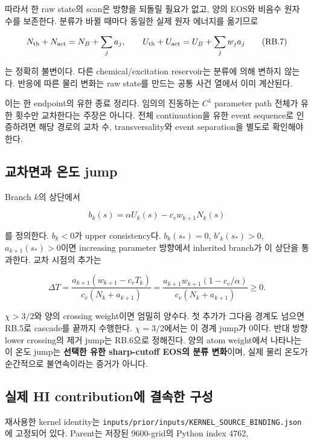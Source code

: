 따라서 한 raw state의 scan은 방향을 되돌릴 필요가 없고, 양의 EOS와 비음수 원자 수를 보존한다. 분류가 바뀔 때마다 동일한 실제 원자 에너지를 옮기므로

\[N_{\rm th}+N_{\rm act}=N_B+\sum_j a_j,\qquad U_{\rm th}+U_{\rm act}=U_B+\sum_jw_ja_j\tag{RB.7}\]

는 정확히 불변이다. 다른 chemical/excitation reservoir는 분류에 의해 변하지 않는다. 반응에 따른 물리 변화는 raw state를 만드는 공통 사건 열에서 이미 계산된다.

이는 한 endpoint의 유한 종료 정리다. 임의의 진동하는 \(C^1\) parameter path 전체가 유한 횟수만 교차한다는 주장은 아니다. 전체 continuation을 유한 event sequence로 인증하려면 해당 경로의 교차 수, transversality와 event separation을 별도로 확인해야 한다.

\hypertarget{uxad50uxcc28uxba74uxacfc-uxc628uxb3c4-jump}{%
\subsection{교차면과 온도 jump}\label{uxad50uxcc28uxba74uxacfc-uxc628uxb3c4-jump}}

Branch \(k\)의 상단에서

\[b_k(s)=\alpha U_k(s)-c_vw_{k+1}N_k(s)\tag{RB.8}\]

를 정의한다. \(b_k<0\)가 upper consistency다. \(b_k(s_*)=0\), \(b'_k(s_*)>0\), \(a_{k+1}(s_*)>0\)이면 increasing parameter 방향에서 inherited branch가 이 상단을 통과한다. 교차 시점의 추가는

\[\Delta T=\frac{a_{k+1}(w_{k+1}-c_vT_k)}{c_v(N_k+a_{k+1})}
=\frac{a_{k+1}w_{k+1}(1-c_v/\alpha)}{c_v(N_k+a_{k+1})}\ge0.\tag{RB.9}\]

\(\chi>3/2\)와 양의 crossing weight이면 엄밀히 양수다. 첫 추가가 그다음 경계도 넘으면 RB.5로 cascade를 끝까지 수행한다. \(\chi=3/2\)에서는 이 경계 jump가 0이다. 반대 방향 lower crossing의 제거 jump는 RB.6으로 정해진다. 양의 atom weight에서 나타나는 이 온도 jump는 \textbf{선택한 유한 sharp-cutoff EOS의 분류 변화}이며, 실제 물리 온도가 순간적으로 불연속이라는 증거가 아니다.

\hypertarget{uxc2e4uxc81c-hi-contributionuxc5d0-uxacb0uxc18duxd55c-uxad6cuxc131}{%
\subsection{실제 HI contribution에 결속한 구성}\label{uxc2e4uxc81c-hi-contributionuxc5d0-uxacb0uxc18duxd55c-uxad6cuxc131}}

재사용한 kernel identity는 \nolinkurl{inputs/prior/inputs/KERNEL_SOURCE_BINDING.json}에 고정되어 있다. Parent는 저장된 9600-grid의 Python index 4762,

